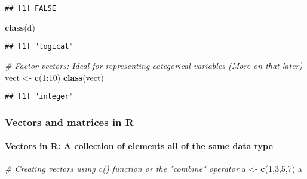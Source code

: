 \documentclass[
]{article}
\newenvironment{Shaded}{\begin{snugshade}}{\end{snugshade}}
\newcommand{\CommentTok}[1]{\textcolor[rgb]{0.56,0.35,0.01}{\textit{#1}}}
\newcommand{\DecValTok}[1]{\textcolor[rgb]{0.00,0.00,0.81}{#1}}
\newcommand{\KeywordTok}[1]{\textcolor[rgb]{0.13,0.29,0.53}{\textbf{#1}}}
\newcommand{\NormalTok}[1]{#1}
\newcommand{\OperatorTok}[1]{\textcolor[rgb]{0.81,0.36,0.00}{\textbf{#1}}}
\newcommand{\StringTok}[1]{\textcolor[rgb]{0.31,0.60,0.02}{#1}}
\begin{document}
\begin{verbatim}
## [1] FALSE
\end{verbatim}

\begin{Shaded}
\begin{Highlighting}[]
\KeywordTok{class}\NormalTok{(d)}
\end{Highlighting}
\end{Shaded}

\begin{verbatim}
## [1] "logical"
\end{verbatim}

\begin{Shaded}
\begin{Highlighting}[]
\CommentTok{# Factor vectors: Ideal for representing categorical variables (More on that later)}
\NormalTok{vect <-}\StringTok{ }\KeywordTok{c}\NormalTok{(}\DecValTok{1}\OperatorTok{:}\DecValTok{10}\NormalTok{)}
\KeywordTok{class}\NormalTok{(vect)}
\end{Highlighting}
\end{Shaded}

\begin{verbatim}
## [1] "integer"
\end{verbatim}

\hypertarget{vectors-and-matrices-in-r}{%
\subsubsection{Vectors and matrices in
R}\label{vectors-and-matrices-in-r}}

\hypertarget{vectors-in-r-a-collection-of-elements-all-of-the-same-data-type}{%
\paragraph{Vectors in R: A collection of elements all of the same data
type}\label{vectors-in-r-a-collection-of-elements-all-of-the-same-data-type}}

\begin{Shaded}
\begin{Highlighting}[]
\CommentTok{# Creating vectors using c() function or the "combine" operator}
\NormalTok{a <-}\StringTok{ }\KeywordTok{c}\NormalTok{(}\DecValTok{1}\NormalTok{,}\DecValTok{3}\NormalTok{,}\DecValTok{5}\NormalTok{,}\DecValTok{7}\NormalTok{) }
\NormalTok{a}
\end{Highlighting}
\end{Shaded}
\end{document}
